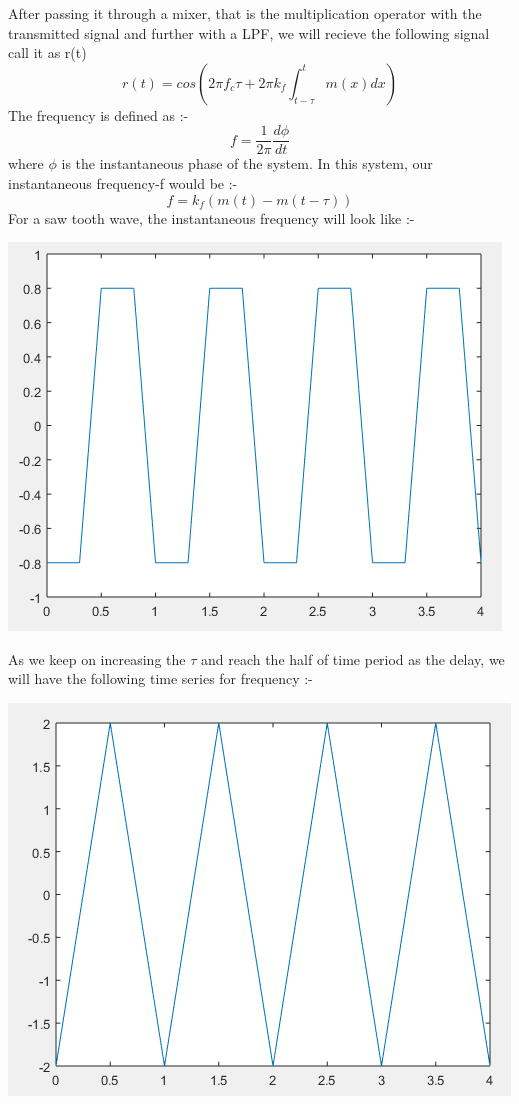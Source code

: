 \documentclass[12pt]{article}
\begin{document}
\begin{flushleft}
After passing it through a mixer, that is the multiplication operator with the transmitted signal and further with a LPF, we will recieve the following signal call it as r(t)
\[r(t) = cos(2\pi f_c\tau+2\pi k_f \int_{t- \tau}^{t} m(x) dx )\]
The frequency is defined as :-
\[f = \frac{1}{2\pi}\frac{d\phi}{dt}\]
where $\phi$ is the instantaneous phase of the system. In this system, our instantaneous frequency-f would be :-
\[f = k_f(m(t) - m(t-\tau))\]
For a saw tooth wave, the instantaneous frequency will look like :- \\
\begin{center}
    \includegraphics[scale = 0.55]{diff.PNG}\\[1.0 cm]
    \caption{\label{fig:diff.PNG}{For some $\tau$ the freq of LPF output}}
\end{center}
As we keep on increasing the $\tau$ and reach the half of time period as the delay, we will have the following time series for frequency :- \\
\begin{center}
     \includegraphics[scale = 0.55]{diff4.PNG}\\[1.0 cm]

\end{center}
\end{flushleft}
\end{document}
